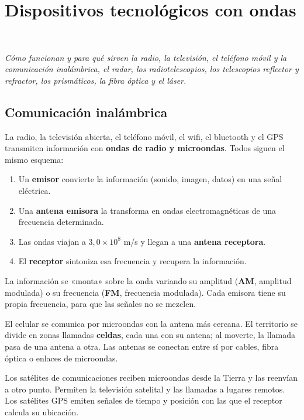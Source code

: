 \section[Dispositivos tecnológicos con ondas]{Dispositivos tecnológicos con ondas}
\modcomun\ \ {\color{gris}\itshape Cómo funcionan y para qué sirven la radio, la televisión, el teléfono móvil y la comunicación inalámbrica, el radar, los radiotelescopios, los telescopios reflector y refractor, los prismáticos, la fibra óptica y el láser.\par}
\subsection{Comunicación inalámbrica}
La radio, la televisión abierta, el teléfono móvil, el wifi, el bluetooth y el GPS transmiten información con \textbf{ondas de radio y microondas}. Todos siguen el mismo esquema:

 
\begin{enumerate}
  \item Un \textbf{emisor} convierte la información (sonido, imagen, datos) en una señal eléctrica.
  \item Una \textbf{antena emisora} la transforma en ondas electromagnéticas de una frecuencia determinada.
  \item Las ondas viajan a $3{,}0\times10^{8}$ m/s y llegan a una \textbf{antena receptora}.
  \item El \textbf{receptor} sintoniza esa frecuencia y recupera la información.
\end{enumerate}
 

La información se «monta» sobre la onda variando su amplitud (\textbf{AM}, amplitud modulada) o su frecuencia (\textbf{FM}, frecuencia modulada). Cada emisora tiene su propia frecuencia, para que las señales no se mezclen.

  
\begin{clave} El celular se comunica por microondas con la antena más cercana. El territorio se divide en zonas llamadas \textbf{celdas}, cada una con su antena; al moverte, la llamada pasa de una antena a otra. Las antenas se conectan entre sí por cables, fibra óptica o enlaces de microondas.\end{clave}
 
\begin{clave}[{Satélites}] Los satélites de comunicaciones reciben microondas desde la Tierra y las reenvían a otro punto. Permiten la televisión satelital y las llamadas a lugares remotos. Los satélites GPS emiten señales de tiempo y posición con las que el receptor calcula su ubicación.\end{clave}
